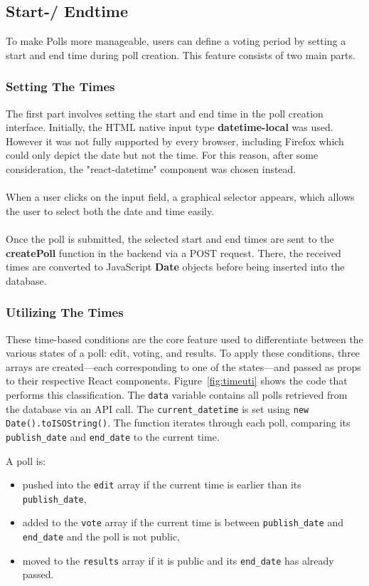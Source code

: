 \documentclass[a4paper,12pt]{report}
\begin{document}
\subsection{Start-/ Endtime}
To make Polls more manageable, users can define a voting period by setting a start and end time during poll creation. This feature consists of two main parts.
\subsubsection{Setting The Times}
The first part involves setting the start and end time in the poll creation interface. Initially, the HTML native input type \textbf{datetime-local} was used. However it was not fully supported by every browser, including Firefox which could only depict the date but not the time. For this reason, after some consideration, the "react-datetime" component was chosen instead.\\\\
When a user clicks on the input field, a graphical selector appears, which allows the user to select both the date and time easily.\\\\
Once the poll is submitted, the selected start and end times are sent to the \textbf{createPoll} function in the backend via a POST request. There, the received times are converted to JavaScript \textbf{Date} objects before being inserted into the database.
\subsubsection{Utilizing The Times}
These time-based conditions are the core feature used to differentiate between the various states of a poll: edit, voting, and results. To apply these conditions, three arrays are created—each corresponding to one of the states—and passed as props to their respective React components.  
Figure~\ref{fig:timeuti} shows the code that performs this classification. The \texttt{data} variable contains all polls retrieved from the database via an API call. The \texttt{current\_datetime} is set using \texttt{new Date().toISOString()}. The function iterates through each poll, comparing its \texttt{publish\_date} and \texttt{end\_date} to the current time.

A poll is:
\begin{itemize}
	\item pushed into the \texttt{edit} array if the current time is earlier than its \texttt{publish\_date},
	\item added to the \texttt{vote} array if the current time is between \texttt{publish\_date} and \texttt{end\_date} and the poll is not public,
	\item moved to the \texttt{results} array if it is public and its \texttt{end\_date} has already passed.
\end{itemize}
\end{document}
